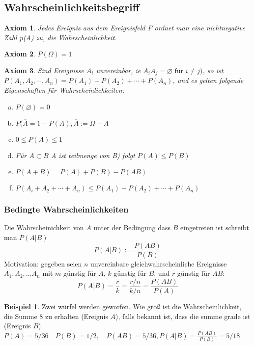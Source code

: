 \documentclass[a4paper]{article}
\newtheorem{axiom}{Axiom}[section]
\theoremstyle{definition}
\newtheorem{beispiel}{Beispiel}
\theoremstyle{remark}
\begin{document}
\subsection{Wahrscheinlichkeitsbegriff}
\label{sub:wahrscheinlichkeitsbegriff}
\begin{axiom}
Jedes Ereignis aus dem Ereignisfeld F ordnet man eine nichtnegative Zahl p(A) zu, die Wahrscheinlichkeit.
\end{axiom}
\begin{axiom}
$P(\Omega )=1$
\end{axiom}
\begin{axiom}
Sind Ereignisse $A_{i}$ unvereinbar, ie $A_iA_j=\varnothing \textrm{ für }i\neq j)$, so ist\\
$P(A_1,A_2,\cdots, A_n)= P(A_1)+P(A_2)+\cdots+ P(A_n)$,
und es gelten folgende Eigenschaften für Wahrscheinlichkeiten:
\begin{enumerate}[(a)]
  \item $ P(\varnothing)= 0$ 
  \item $ P(\overline{A}= 1-P(A),\overline{A}:= \Omega -A$
  \item $0\leq P(A)\leq 1$
  \item Für $ A\subset B$ A ist teilmenge von B) folgt $P(A) \leq P(B)$ 
  \item $ P(A+B)= P(A)+P(B)-P(AB)$
  \item $ P(A_i+A_2+\cdots+A_n)\leq P(A_1)+P(A_2)+\cdots+P(A_n)$
\end{enumerate}
\end{axiom}
  \subsubsection{Bedingte Wahrscheinlichkeiten} 
  \label{ssub:bedingte_wahrscheinlichkeiten}
  Die Wahrscheinichkeit von $A$ unter der  Bedingung dass $B$ eingetreten ist schreibt man $P(A|B)$
  \begin{equation}
    P(A|B):= \frac{P(AB)}{P(B)}
  \end{equation} 
  Motivation: gegeben seien $n$ unvereinbare gleichwahrscheinliche Ereignisse $A_1,A_2,\dots A_n$ mit $m$ günstig für $A$, $k$ günstig für $B$, und $r$ günstig für $AB$:
\begin{equation}
  P(A|B)= \frac{r}{k}=\frac{r/n}{k/n}=\frac{P(AB)}{P(A)}
\end{equation} 
\begin{beispiel}
 Zwei würfel werden geworfen. Wie groß ist die Wahrscheinlichkeit, die Summe 8 zu erhalten (Ereignis $A$), falls bekannt ist, dass die summe grade ist (Ereignis $B$)
\\$P(A)=5/36 \quad P(B)=1/2, \quad P(AB)=5/36, P(A|B)=\frac{P(AB)}{P(B)}=5/18$
\end{beispiel}
\end{document}
